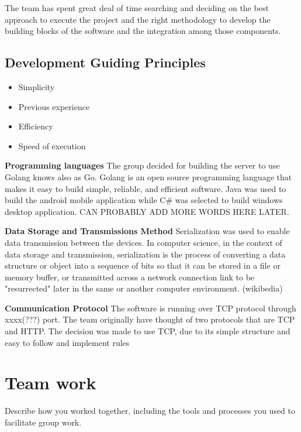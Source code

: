 \documentclass{article}
\begin{document}
The team has spent great deal of time searching and deciding on the best approach to execute the project and the right methodology to develop the building blocks of the software and the integration among those components.

\subsection{Development Guiding Principles}

\begin{itemize}
  \item Simplicity
  \item Previous experience
  \item Efficiency
  \item Speed of execution
\end{itemize}


\newline
\hfill \break
\textbf{Programming languages}
The group decided for building the server to use Golang knows also as Go. Golang is an open source programming language that makes it easy to build simple, reliable, and efficient software.
Java was used to build the android mobile application while C# was selected to build windows desktop application. CAN PROBABLY ADD MORE WORDS HERE LATER.

\newline
\hfill \break
\textbf{Data Storage and Transmissions Method}
Serialization was used to enable data transmission between the devices. In computer science, in the context of data storage and transmission, serialization is the process of converting a data structure or object into a sequence of bits so that it can be stored in a file or memory buffer, or transmitted across a network connection link to be "resurrected" later in the same or another computer environment. (wikibedia)

\newline
\hfill \break
\textbf{Communication Protocol}
The software is running over TCP protocol through xxxx(???) port. The team originally have thought of two protocols that are TCP and HTTP. The decision was made to use TCP, due to its simple structure and easy to follow and implement rules


\section{Team work}
Describe how you worked together, including the tools and processes you used to facilitate group work.
\end{document}
